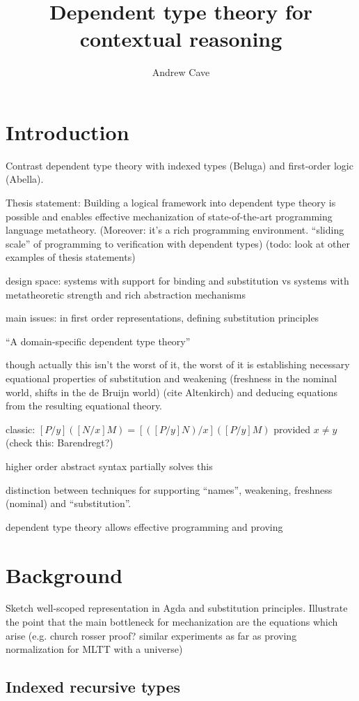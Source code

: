 \documentclass{article}
\author{Andrew Cave}
\title{Dependent type theory for contextual reasoning}
\begin{document}
\maketitle

\section{Introduction}
Contrast dependent type theory with indexed types (Beluga) and first-order
logic (Abella).

Thesis statement: Building a logical framework into dependent type
theory is possible and enables effective mechanization of state-of-the-art programming
language metatheory. (Moreover: it's a rich programming
environment. ``sliding scale'' of programming to verification with dependent types)
(todo: look at other examples of thesis statements)

design space: systems with support for binding and substitution vs
systems with metatheoretic strength and rich abstraction mechanisms

main issues:
in first order representations, defining substitution principles

``A domain-specific dependent type theory''

though actually this isn't the worst of it, the worst of it is
establishing necessary equational properties of substitution and weakening
(freshness in the nominal world, shifts in the de Bruijn world) (cite
Altenkirch) and deducing equations from the resulting equational
theory.

classic: $[P/y]([N/x]M) = [([P/y]N)/x] ([P/y]M)$ provided $x\neq y$
(check this: Barendregt?)

higher order abstract syntax partially solves this

distinction between techniques for supporting ``names'', weakening, freshness (nominal) and ``substitution''.

dependent type theory allows effective programming and proving
\section{Background}
Sketch well-scoped representation in Agda and substitution
principles. Illustrate the point that the main bottleneck for
mechanization are the equations which arise (e.g. church rosser proof?
similar experiments as far as proving normalization for MLTT with a universe)

\subsection{Indexed recursive types}
\end{document}
